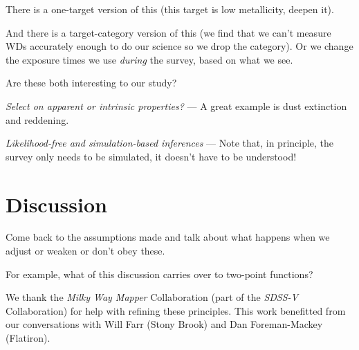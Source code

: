 \documentclass[modern]{aastex62}
\newcommand{\project}[1]{\textsl{#1}}
\renewcommand{\paragraph}[1]{\medskip\noindent\textit{#1} ---}
\begin{document}
There is a one-target version of this (this target is low metallicity, deepen it).

And there is a target-category version of this (we find that we can't measure WDs
accurately enough to do our science so we drop the category). Or we change the exposure
times we use \emph{during} the survey, based on what we see.

Are these both interesting to our study?

\paragraph{Select on apparent or intrinsic properties?}
A great example is dust extinction and reddening.

\paragraph{Likelihood-free and simulation-based inferences}
Note that, in principle, the survey only needs to be simulated, it doesn't have
to be understood!

\section{Discussion}

Come back to the assumptions made and talk about what happens when we
adjust or weaken or don't obey these.

For example, what of this discussion carries over to two-point functions?

\acknowledgements We thank the \project{Milky Way
  Mapper} Collaboration (part of the \project{SDSS-V} Collaboration)
for help with refining these principles.
This work benefitted from our conversations with
  Will Farr (Stony Brook) and
  Dan Foreman-Mackey (Flatiron).
\end{document}
